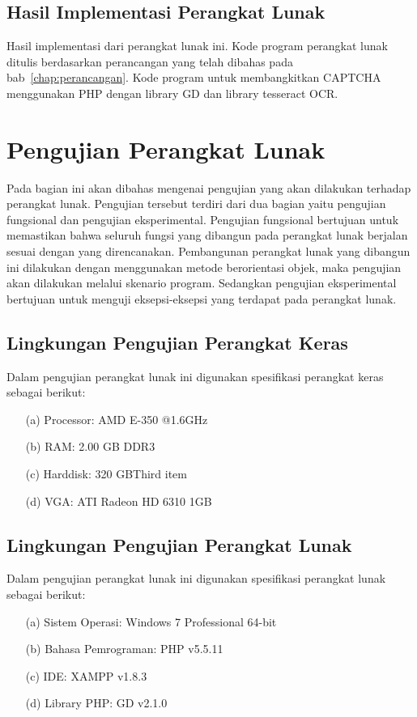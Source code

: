 \subsection{Hasil Implementasi Perangkat Lunak}
\label{sec:hasilimplementasi}

Hasil implementasi dari perangkat lunak ini. Kode program perangkat lunak ditulis berdasarkan perancangan yang telah dibahas pada bab~\ref{chap:perancangan}. Kode program untuk membangkitkan CAPTCHA menggunakan PHP dengan library GD dan library tesseract OCR.

\section{Pengujian Perangkat Lunak}
\label{sec:pengujianperangkatlunak}

Pada bagian ini akan dibahas mengenai pengujian yang akan dilakukan terhadap perangkat lunak. Pengujian tersebut terdiri dari dua bagian yaitu pengujian fungsional dan pengujian eksperimental. Pengujian fungsional bertujuan untuk memastikan bahwa seluruh fungsi yang dibangun pada perangkat lunak berjalan sesuai dengan yang direncanakan. Pembangunan perangkat lunak yang dibangun ini dilakukan dengan menggunakan metode berorientasi objek, maka pengujian akan dilakukan melalui skenario program. Sedangkan pengujian eksperimental bertujuan untuk menguji eksepsi-eksepsi yang terdapat pada perangkat lunak.

\subsection{Lingkungan Pengujian Perangkat Keras}
\label{sec:lingkunganpengujianperangkatkeras}

Dalam pengujian perangkat lunak ini digunakan spesifikasi perangkat keras sebagai berikut:

\begin{enumerate}
\item[(a)] Processor: AMD E-350 @1.6GHz
\item[(b)] RAM: 2.00 GB DDR3
\item[(c)] Harddisk: 320 GBThird item
\item[(d)] VGA: ATI Radeon HD 6310 1GB
\end{enumerate}

\subsection{Lingkungan Pengujian Perangkat Lunak}
\label{sec:lingkunganpengujianperangkatlunak}

Dalam pengujian perangkat lunak ini digunakan spesifikasi perangkat lunak sebagai berikut:

\begin{enumerate}
\item[(a)] Sistem Operasi: Windows 7 Professional 64-bit
\item[(b)] Bahasa Pemrograman: PHP v5.5.11
\item[(c)] IDE: XAMPP v1.8.3
\item[(d)] Library PHP: GD v2.1.0
\end{enumerate}
